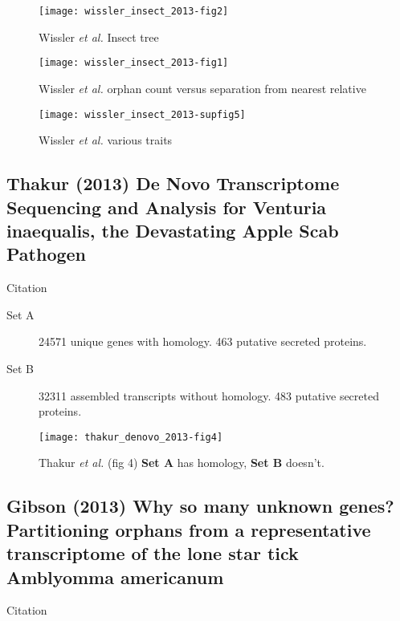     \begin{figure}[h!] \centering
        \texttt{[image: wissler\_insect\_2013-fig2]} \caption{
            Wissler \textit{et al.} Insect tree } \end{figure}

    \begin{figure}[h!] \centering
        \texttt{[image: wissler\_insect\_2013-fig1]} \caption{
            Wissler \textit{et al.} orphan count versus separation from
        nearest relative } \end{figure}

    \begin{figure}[h!] \centering
        \texttt{[image: wissler\_insect\_2013-supfig5]} \caption{
            Wissler \textit{et al.} various traits } \end{figure}

    \FloatBarrier

\subsection{Thakur (2013) De Novo Transcriptome Sequencing and Analysis for
Venturia inaequalis, the Devastating Apple Scab Pathogen}

    Citation \cite{thakur_novo_2013}

    \begin{description}
        \item[Set A] 24571 unique genes with homology. 463 putative secreted
            proteins.
        \item[Set B] 32311 assembled transcripts without homology. 483 putative
            secreted proteins.
    \end{description}

    \begin{figure}[h!] \centering
        \texttt{[image: thakur\_denovo\_2013-fig4]}
        \caption{
            Thakur \textit{et al.} (fig 4) \textbf{Set A} has homology,
            \textbf{Set B} doesn't.
        }
    \end{figure}
    \FloatBarrier

\subsection{Gibson (2013) Why so many unknown genes? Partitioning orphans
from a representative transcriptome of the lone star tick Amblyomma
americanum}

    Citation \cite{gibson_why_2013}

